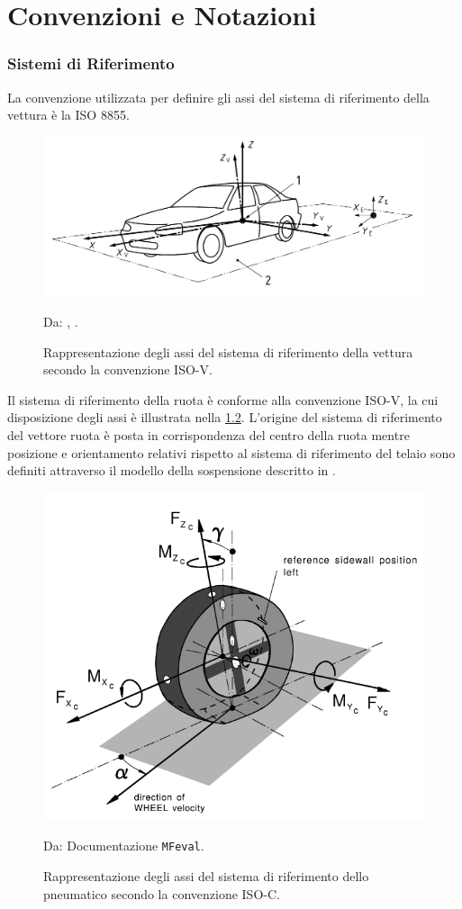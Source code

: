 \chapter{Convenzioni e Notazioni}
\label{Notazioni}
%
\subsection{Sistemi di Riferimento}
La convenzione utilizzata per definire gli assi del sistema di riferimento della vettura è la \ac{ISO} 8855.

\begin{figure}[h!]
	\centering
	\includegraphics[width=0.8\linewidth]{Figures/iso_convention}
	\caption{Rappresentazione degli assi del sistema di riferimento della vettura secondo la convenzione ISO-V.}
	Da: \citeauthor{Ginebra}, .
	\label{isoconventionv}
\end{figure}

\noindent
Il sistema di riferimento della ruota è conforme alla convenzione \ac{ISO}-V, la cui disposizione degli assi è illustrata nella \figurename{ \ref{isoconventionc}}. L'origine del sistema di riferimento del vettore ruota è posta in corrispondenza del centro della ruota mentre posizione e orientamento relativi rispetto al sistema di riferimento del telaio sono definiti attraverso il modello della sospensione descritto in \cite{Larcher}.

\begin{figure}[h!]
	\centering
	\includegraphics[width=0.6\linewidth]{Figures/iso_convention_wheel}
	\caption{Rappresentazione degli assi  del sistema di riferimento dello pneumatico secondo la convenzione ISO-C.}
	Da: Documentazione \texttt{MFeval}.
	\label{isoconventionc}
\end{figure}
%
